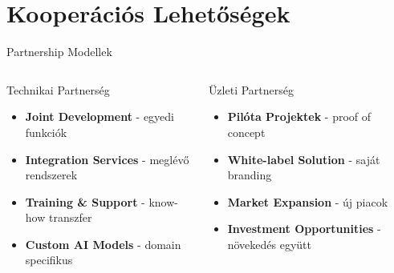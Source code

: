 \documentclass[aspectratio=169,10pt]{beamer}
\newcommand{\highlight}[1]{\textcolor{virtplc-blue}{\textbf{#1}}}
\begin{document}
\section{Kooperációs Lehetőségek}

\begin{frame}{Partnership Modellek}
    \begin{columns}[c]
        \begin{block}{Technikai Partnerség}
            \begin{itemize}
                \item \highlight{Joint Development} - egyedi funkciók
                \item \highlight{Integration Services} - meglévő rendszerek
                \item \highlight{Training \& Support} - know-how transzfer
                \item \highlight{Custom AI Models} - domain specifikus
            \end{itemize}
        \end{block}
        
        \begin{block}{Üzleti Partnerség}
            \begin{itemize}
                \item \highlight{Pilóta Projektek} - proof of concept
                \item \highlight{White-label Solution} - saját branding
                \item \highlight{Market Expansion} - új piacok
                \item \highlight{Investment Opportunities} - növekedés együtt
            \end{itemize}
        \end{block}
    \end{columns}
\end{frame}
\end{document}
